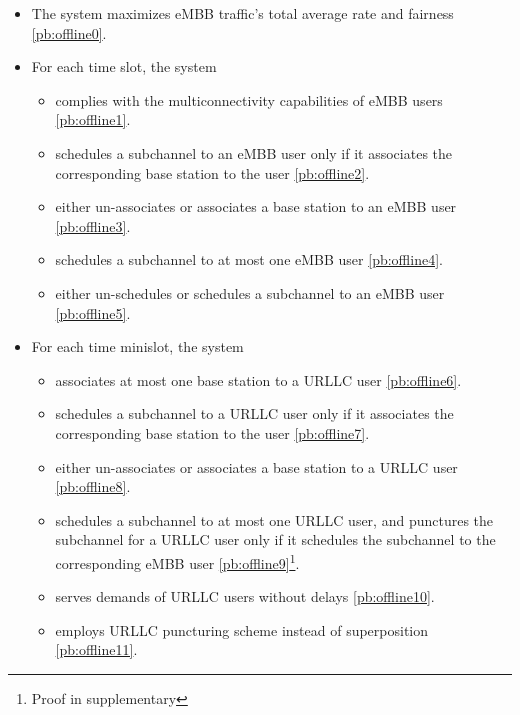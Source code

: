 \begin{frame}
  \begin{itemize}
    \item The system maximizes eMBB traffic's total average rate and fairness \eqref{pb:offline0}.
    \item For each time slot, the system
      \begin{itemize}
        \item complies with the multiconnectivity capabilities of eMBB users \eqref{pb:offline1}.
        \item schedules a subchannel to an eMBB user only if it associates the corresponding base station to the user \eqref{pb:offline2}.
        \item either un-associates or associates a base station to an eMBB user \eqref{pb:offline3}.
        \item schedules a subchannel to at most one eMBB user \eqref{pb:offline4}.
        \item either un-schedules or schedules a subchannel to an eMBB user \eqref{pb:offline5}.
      \end{itemize}
  \end{itemize}
\end{frame}

\begin{frame}
  \begin{itemize}
    \item For each time minislot, the system
      \begin{itemize}
        \item associates at most one base station to a URLLC user \eqref{pb:offline6}.
        \item schedules a subchannel to a URLLC user only if it associates the corresponding base station to the user \eqref{pb:offline7}.
        \item either un-associates or associates a base station to a URLLC user \eqref{pb:offline8}.
        \item schedules a subchannel to at most one URLLC user, and punctures the subchannel for a URLLC user only if it schedules the subchannel to the corresponding eMBB user \eqref{pb:offline9}\footnote{Proof in supplementary}.
        \item serves demands of URLLC users without delays \eqref{pb:offline10}.
        \item employs URLLC puncturing scheme instead of superposition \eqref{pb:offline11}.
      \end{itemize}
  \end{itemize}
\end{frame}


